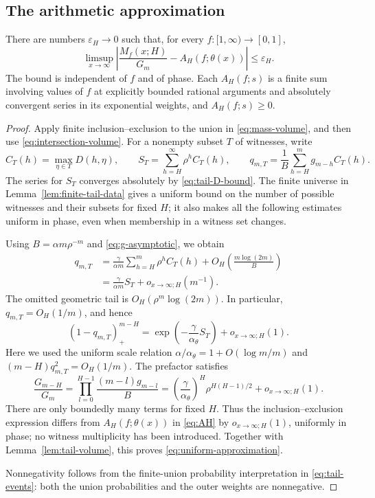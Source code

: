 \subsection{The arithmetic approximation}

\begin{proposition}
\label{prop:tail-limit}
There are numbers $\varepsilon_H\to0$ such that, for every
$f:[1,\infty)\to[0,1]$,
\begin{equation}
 \limsup_{x\to\infty}
 \left|\frac{M_f(x;H)}{G_m}-A_H(f;\theta(x))\right|
 \le\varepsilon_H.
 \label{eq:uniform-approximation}
\end{equation}
The bound is independent of $f$ and of phase.  Each $A_H(f;s)$ is a finite sum involving values of $f$ at explicitly
bounded rational arguments and absolutely convergent series in its
exponential weights, and $A_H(f;s)\ge0$.
\end{proposition}

\begin{proof}
Apply finite inclusion--exclusion to the union in
\eqref{eq:mass-volume}, and then use \eqref{eq:intersection-volume}.
For a nonempty subset $T$ of witnesses, write
\[
 C_T(h)=\max_{\eta\in T}D(h,\eta),\qquad
 S_T=\sum_{h=H}^{\infty}\rho^hC_T(h),\qquad
 q_{m,T}=\frac1B\sum_{h=H}^mg_{m-h}C_T(h).
\]
The series for $S_T$ converges absolutely by
\eqref{eq:tail-D-bound}.  The finite universe in
Lemma~\ref{lem:finite-tail-data} gives a uniform bound on the number
of possible witnesses and their subsets for fixed $H$; it also
makes all the following estimates uniform in phase, even when
membership in a witness set changes.

Using $B=\alpha m\rho^{-m}$ and \eqref{eq:g-asymptotic}, we obtain
\begin{align*}
 q_{m,T}
 &=\frac{\gamma}{\alpha m}
       \sum_{h=H}^m\rho^h C_T(h)
       +O_H\!\left(\frac{m\log(2m)}B\right)\\
 &=\frac{\gamma}{\alpha m}S_T+o_{x\to\infty;H}(m^{-1}).
\end{align*}
The omitted geometric tail is $O_H(\rho^m\log(2m))$.
In particular, $q_{m,T}=O_H(1/m)$, and hence
\[
 (1-q_{m,T})_+^{m-H}
 =\exp\!\left(-\frac\gamma{\alpha_\theta}S_T\right)
       +o_{x\to\infty;H}(1).
\]
Here we used the uniform scale relation
$\alpha/\alpha_\theta=1+O(\log m/m)$ and
$(m-H)q_{m,T}^2=O_H(1/m)$.  The prefactor satisfies
\begin{equation}
 \frac{G_{m-H}}{G_m}
 =\prod_{l=0}^{H-1}\frac{(m-l)g_{m-l}}B
 =\left(\frac\gamma{\alpha_\theta}\right)^H
    \rho^{H(H-1)/2}+o_{x\to\infty;H}(1).
 \label{eq:volume-prefactor-limit}
\end{equation}
There are only boundedly many terms for fixed $H$.  Thus the
inclusion--exclusion expression differs from $A_H(f;\theta(x))$
in \eqref{eq:AH} by $o_{x\to\infty;H}(1)$, uniformly in phase;
no witness multiplicity has been introduced.
Together with Lemma~\ref{lem:tail-volume}, this proves
\eqref{eq:uniform-approximation}.

Nonnegativity follows from the finite-union probability interpretation
in \eqref{eq:tail-events}: both the union probabilities and the outer
weights are nonnegative.
\end{proof}

